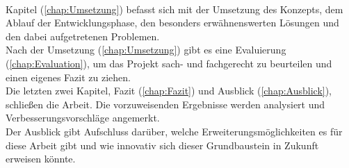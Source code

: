 \\ 
\linebreak
Kapitel (\ref{chap:Umsetzung}) befasst sich mit der Umsetzung des Konzepts, dem Ablauf der Entwicklungsphase, den besonders erwähnenswerten 
Lösungen und den dabei aufgetretenen Problemen.
\\ 
\linebreak
Nach der Umsetzung (\ref{chap:Umsetzung}) gibt es eine Evaluierung (\ref{chap:Evaluation}), um das Projekt sach- und fachgerecht zu beurteilen 
und einen eigenes Fazit zu ziehen.
\\ 
\linebreak 
Die letzten zwei Kapitel, Fazit (\ref{chap:Fazit}) und Ausblick (\ref{chap:Ausblick}), %
schließen die Arbeit. Die vorzuweisenden Ergebnisse werden analysiert und Verbesserungsvorschläge angemerkt.
\\ 
Der Ausblick gibt Aufschluss darüber, welche Erweiterungsmöglichkeiten es für diese Arbeit gibt und wie innovativ sich dieser 
Grundbaustein in Zukunft erweisen könnte. 
\pagebreak

